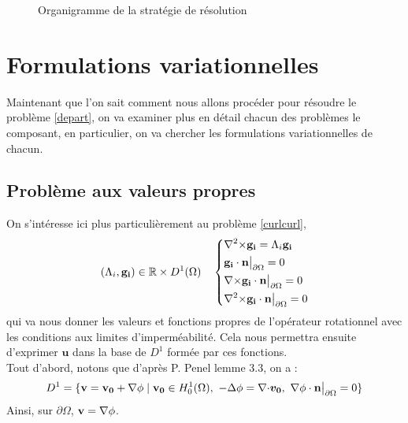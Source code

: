 \begin{figure}[H]
\caption{Organigramme de la stratégie de résolution}\label{org1}
\end{figure}

\chapter{Formulations variationnelles}
\label{fv}
Maintenant que l'on sait comment nous allons procéder pour résoudre le problème \ref{depart}, on va examiner plus en détail chacun des problèmes le composant, en particulier, on va chercher les formulations variationnelles de chacun.

\section{Problème aux valeurs propres}
\label{eigen}
On s'intéresse ici plus particulièrement au problème \ref{curlcurl},
\begin{equation*}
(\Lambda_i,\mathbf{g_i})\in{\mathbb{R}}\times D^1(\Omega)\quad \left\{\begin{aligned}
&{\nabla^2\times}  \mathbf{g_i} = \Lambda_i \mathbf{g_i}\\
&\mathbf{g_i}\cdot \mathbf{n}{\big\rvert_{\partial\Omega}} = 0\\
&{\nabla\times} \mathbf{g_i}\cdot \mathbf{n}{\big\rvert_{\partial\Omega}} = 0\\
&{\nabla^2\times}  \mathbf{g_i}\cdot \mathbf{n}{\big\rvert_{\partial\Omega}} = 0
\end{aligned}\right.
\end{equation*}
qui va nous donner les valeurs et fonctions propres de l'opérateur rotationnel avec les conditions aux limites d'imperméabilité. Cela nous permettra ensuite d'exprimer $\mathbf{u}$ dans la base de $D^1$ formée par ces fonctions.\\

Tout d'abord, notons que d'après P. Penel \cite{Penel2004} lemme 3.3, on a :
\[ D^1 = \{\mathbf{v}=\mathbf{v_0}+\grad\phi\; |\; \mathbf{v_0}\in H^1_0(\Omega),\ -\laplace\phi=\div\bm{v_0},\ \grad\phi\cdot \mathbf{n}\restr = 0 \} \]
Ainsi, sur $\partial\Omega$, $\mathbf{v}={\nabla}\phi$.\\

